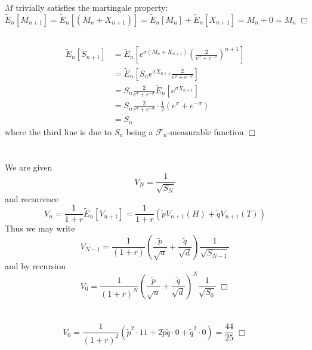 \documentclass{article}
\begin{document}
\section{}
\subsection{}
$M$ trivially satisfies the martingale property:
$$\widetilde{E}_n[M_{n+1}] = \widetilde{E}_n[(M_{n} + X_{n+1})] = \widetilde{E}_n[M_n] + \widetilde{E}_n[X_{n+1}] = M_n + 0 = M_n \; \Box$$

\subsection{}
\begin{equation*}
\begin{split}
\widetilde{E}_n[S_{n+1}] &= \widetilde{E}_n[e^{\sigma (M_n + X_{n+1})} \left(\frac{2}{e^\sigma + e^{-\sigma}}\right)^{n+1}]\\
&= \widetilde{E}_n[S_n e^{\sigma X_{n+1}} \frac{2}{e^\sigma + e^{-\sigma}}]\\
&= S_n \frac{2}{e^\sigma + e^{-\sigma}} \widetilde{E}_n[e^{\sigma X_{n+1}}]\\
&= S_n \frac{2}{e^\sigma + e^{-\sigma}} \cdot \frac{1}{2} \left( e^\sigma + e^{-\sigma} \right)\\
&= S_n
\end{split}
\end{equation*}
where the third line is due to $S_n$ being a $\mathcal{F}_n$-measurable function $\Box$

\section{}
We are given
$$V_N = \frac{1}{\sqrt{S_N}}$$
and recurrence
$$V_n = \frac{1}{1+r} \widetilde{E}_n[V_{n+1}] = \frac{1}{1+r} \left( \tilde{p}V_{n+1}(H) + \tilde{q}V_{n+1}(T) \right)$$
Thus we may write
$$V_{N-1} = \frac{1}{(1+r)} \left( \frac{\tilde{p}}{\sqrt{u}} + \frac{\tilde{q}}{\sqrt{d}} \right) \frac{1}{\sqrt{S_{N-1}}}$$
and by recursion
$$V_0 = \frac{1}{(1+r)^N} \left( \frac{\tilde{p}}{\sqrt{u}} + \frac{\tilde{q}}{\sqrt{d}} \right)^N \frac{1}{\sqrt{S_0}} \; \Box$$

\section{}
\subsection{}
$$V_0 = \frac{1}{(1+r)^2} \left( \tilde{p}^2 \cdot 11 + 2\tilde{p}\tilde{q} \cdot 0 + \tilde{q}^2 \cdot 0 \right) = \frac{44}{25} \; \Box$$
\end{document}
